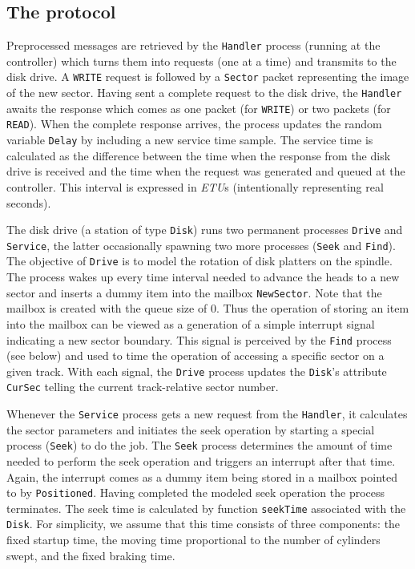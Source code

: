 \subsection{The protocol}

Preprocessed messages are retrieved by the {\tt Handler} process
(running at the controller) which
turns them into requests (one at a time) and transmits to the disk drive.
A {\tt WRITE} request is followed by a {\tt Sector} packet representing the
image of the new sector.
Having sent a complete request to the disk drive, the {\tt Handler}
awaits the response which comes as one packet (for {\tt WRITE})
or two packets (for {\tt READ}).
When the complete response arrives, the process updates the random variable
{\tt Delay} by including a new service time sample.
The service time is calculated as the difference between the time when
the response from the disk drive is received and the time when the
request was generated and queued at the controller.
This interval is expressed in {\em ETU\/}s (intentionally representing
real seconds).

The disk drive (a station of type {\tt Disk})
runs two permanent processes {\tt Drive} and {\tt Service},
the latter occasionally spawning two more processes ({\tt Seek} and
{\tt Find}).
The objective of {\tt Drive} is to model the rotation of disk platters on the
spindle.
The process wakes up every time interval needed to advance the heads to a new
sector and inserts a dummy item into the mailbox {\tt NewSector}.
Note that the mailbox is created with the queue size of $0$.
Thus the operation of storing an item into the mailbox can be viewed as
a generation of a simple interrupt signal indicating a new sector
boundary.
This signal is perceived by the {\tt Find} process (see below) and used to
time the operation of accessing a specific sector on a given track.
With each signal, the {\tt Drive} process
updates the {\tt Disk}'s attribute {\tt CurSec} telling the current
track-relative sector number.

Whenever the {\tt Service} process gets a new request from the {\tt Handler},
it calculates the sector parameters and initiates the seek operation by
starting a special process ({\tt Seek}) to do the job.
The {\tt Seek} process determines the amount of time needed to perform the
seek operation and triggers an interrupt after that time.
Again, the interrupt comes as a dummy item being stored in a mailbox
pointed to by {\tt Positioned}.
Having completed the modeled seek operation the process terminates.
The seek time is calculated by function {\tt seekTime} associated with the
{\tt Disk}.
For simplicity, we assume that this time consists of three components:
the fixed startup time, the moving time proportional to the number of
cylinders swept, and the fixed braking time.

